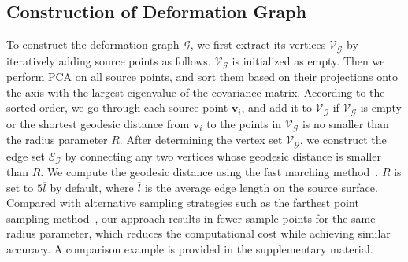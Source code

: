 \subsection{Construction of Deformation Graph}
To construct the deformation graph $\mathcal{G}$, we first extract its vertices $\mathcal{V}_{\mathcal{G}}$ by iteratively adding source points as follows. $\mathcal{V}_{\mathcal{G}}$ is initialized as empty. Then we perform PCA on all source points, and sort them based on their projections onto the axis with the largest eigenvalue of the covariance matrix. According to the sorted order, we go through each source point $\mathbf{v}_i$, and add it to $\mathcal{V}_{\mathcal{G}}$ if $\mathcal{V}_{\mathcal{G}}$ is empty or the shortest geodesic distance from $\mathbf{v}_i$ to the points in $\mathcal{V}_{\mathcal{G}}$ is no smaller than the radius parameter $R$. After determining the vertex set $\mathcal{V}_{\mathcal{G}}$, we construct the edge set $\mathcal{E}_{\mathcal{G}}$ by connecting any two vertices whose geodesic distance is smaller than $R$. We compute the geodesic distance using the fast marching method~\cite{kimmel1998computing}. $R$ is set to $5\overline{l}$ by default, where $\overline{l}$ is the average edge length on the source surface. Compared with alternative sampling strategies such as the farthest point sampling method~\cite{moenning2003fast}, our approach results in fewer sample points for the same radius parameter, which reduces the computational cost while achieving similar accuracy. A comparison example is provided in the supplementary material.


